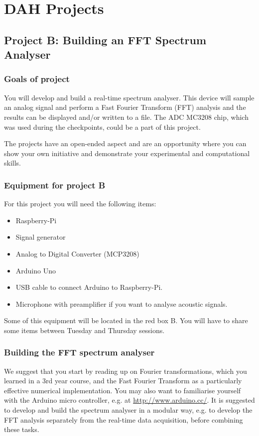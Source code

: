 \chapter{DAH Projects}
\label{sec:projects}


\section{Project B: Building an FFT Spectrum Analyser}

\subsection{Goals of project}

You will develop and build a real-time spectrum analyser. This device will sample an analog signal and perform a Fast Fourier Transform (FFT) analysis and the results can be displayed and/or written to a file. The ADC MC3208 chip, which was used during the checkpoints,  could be a part of this project. 

The projects have an open-ended aspect and are an opportunity where you can show your own initiative and demonstrate your experimental and computational skills. 


\subsection{Equipment for project B}

For this project you will need the following items:
\begin{itemize} 
\item Raspberry-Pi
\item Signal generator
\item Analog to Digital Converter (MCP3208)
\item Arduino Uno 
\item USB cable to connect Arduino to Raspberry-Pi.
\item Microphone with preamplifier if you want to analyse acoustic signals. 
\end{itemize}
Some of this equipment will be located in the red box B. You will have to share some items between Tuesday and Thursday sessions. 


\subsection{Building the FFT spectrum analyser}

We suggest that you start by reading up on Fourier transformations, which you learned in a 3rd year course, and the Fast Fourier Transform as a particularly effective numerical implementation. You may also want to familiarise yourself with the Arduino micro controller, e.g. at \url{http://www.arduino.cc/}. It is suggested to develop and build the spectrum analyser in a modular way, e.g. to develop the FFT analysis separately from the real-time data acquisition, before combining these tasks.

